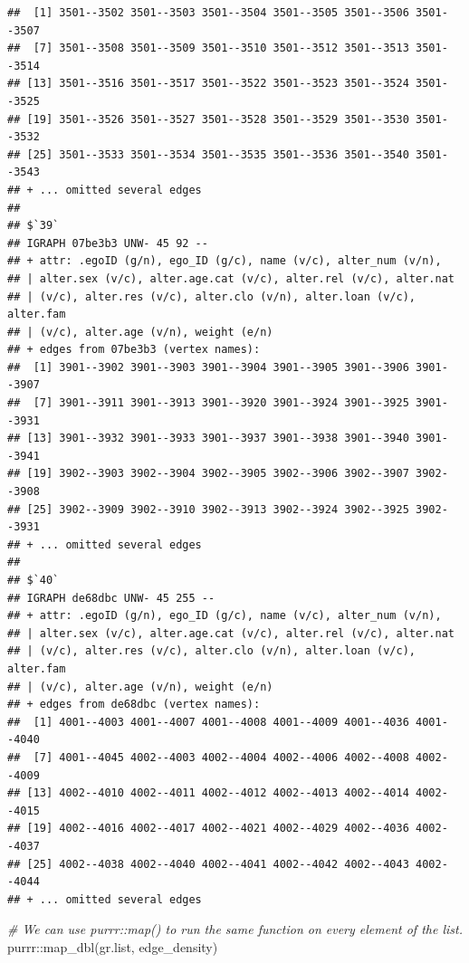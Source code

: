 \documentclass[
]{book}
\newenvironment{Shaded}{\begin{snugshade}}{\end{snugshade}}
\newcommand{\CommentTok}[1]{\textcolor[rgb]{0.56,0.35,0.01}{\textit{#1}}}
\newcommand{\FunctionTok}[1]{\textcolor[rgb]{0.00,0.00,0.00}{#1}}
\newcommand{\NormalTok}[1]{#1}
\newcommand{\SpecialCharTok}[1]{\textcolor[rgb]{0.00,0.00,0.00}{#1}}
\begin{document}
\begin{verbatim}
##  [1] 3501--3502 3501--3503 3501--3504 3501--3505 3501--3506 3501--3507
##  [7] 3501--3508 3501--3509 3501--3510 3501--3512 3501--3513 3501--3514
## [13] 3501--3516 3501--3517 3501--3522 3501--3523 3501--3524 3501--3525
## [19] 3501--3526 3501--3527 3501--3528 3501--3529 3501--3530 3501--3532
## [25] 3501--3533 3501--3534 3501--3535 3501--3536 3501--3540 3501--3543
## + ... omitted several edges
## 
## $`39`
## IGRAPH 07be3b3 UNW- 45 92 -- 
## + attr: .egoID (g/n), ego_ID (g/c), name (v/c), alter_num (v/n),
## | alter.sex (v/c), alter.age.cat (v/c), alter.rel (v/c), alter.nat
## | (v/c), alter.res (v/c), alter.clo (v/n), alter.loan (v/c), alter.fam
## | (v/c), alter.age (v/n), weight (e/n)
## + edges from 07be3b3 (vertex names):
##  [1] 3901--3902 3901--3903 3901--3904 3901--3905 3901--3906 3901--3907
##  [7] 3901--3911 3901--3913 3901--3920 3901--3924 3901--3925 3901--3931
## [13] 3901--3932 3901--3933 3901--3937 3901--3938 3901--3940 3901--3941
## [19] 3902--3903 3902--3904 3902--3905 3902--3906 3902--3907 3902--3908
## [25] 3902--3909 3902--3910 3902--3913 3902--3924 3902--3925 3902--3931
## + ... omitted several edges
## 
## $`40`
## IGRAPH de68dbc UNW- 45 255 -- 
## + attr: .egoID (g/n), ego_ID (g/c), name (v/c), alter_num (v/n),
## | alter.sex (v/c), alter.age.cat (v/c), alter.rel (v/c), alter.nat
## | (v/c), alter.res (v/c), alter.clo (v/n), alter.loan (v/c), alter.fam
## | (v/c), alter.age (v/n), weight (e/n)
## + edges from de68dbc (vertex names):
##  [1] 4001--4003 4001--4007 4001--4008 4001--4009 4001--4036 4001--4040
##  [7] 4001--4045 4002--4003 4002--4004 4002--4006 4002--4008 4002--4009
## [13] 4002--4010 4002--4011 4002--4012 4002--4013 4002--4014 4002--4015
## [19] 4002--4016 4002--4017 4002--4021 4002--4029 4002--4036 4002--4037
## [25] 4002--4038 4002--4040 4002--4041 4002--4042 4002--4043 4002--4044
## + ... omitted several edges
\end{verbatim}

\begin{Shaded}
\begin{Highlighting}[]
\CommentTok{\# We can use purrr::map() to run the same function on every element of the list.}
\NormalTok{purrr}\SpecialCharTok{::}\FunctionTok{map\_dbl}\NormalTok{(gr.list, edge\_density)}
\end{Highlighting}
\end{Shaded}
\end{document}
